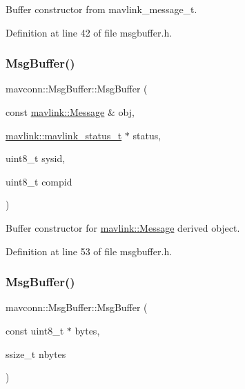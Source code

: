 Buffer constructor from mavlink\+\_\+message\+\_\+t. 



Definition at line 42 of file msgbuffer.\+h.

\mbox{\label{group__mavconn_ga8bcb63913aa131f1c054dc1e18a4d945}} 
\subsubsection{\texorpdfstring{MsgBuffer()}{MsgBuffer()}\hspace{0.1cm}{\footnotesize\ttfamily [3/4]}}
{\footnotesize\ttfamily mavconn\+::\+Msg\+Buffer\+::\+Msg\+Buffer (\begin{DoxyParamCaption}\item[{const \mbox{\hyperlink{structmavlink_1_1Message}{mavlink\+::\+Message}} \&}]{obj,  }\item[{\mbox{\hyperlink{include__v2_80_2mavlink__types_8h_aec6f7af3879252822d8fb108e97aafc2}{mavlink\+::mavlink\+\_\+status\+\_\+t}} $\ast$}]{status,  }\item[{uint8\+\_\+t}]{sysid,  }\item[{uint8\+\_\+t}]{compid }\end{DoxyParamCaption})\hspace{0.3cm}{\ttfamily [inline]}}



Buffer constructor for \mbox{\hyperlink{structmavlink_1_1Message}{mavlink\+::\+Message}} derived object. 



Definition at line 53 of file msgbuffer.\+h.

\mbox{\label{group__mavconn_ga4555922debc003d9ba989aded6714fb5}} 
\subsubsection{\texorpdfstring{MsgBuffer()}{MsgBuffer()}\hspace{0.1cm}{\footnotesize\ttfamily [4/4]}}
{\footnotesize\ttfamily mavconn\+::\+Msg\+Buffer\+::\+Msg\+Buffer (\begin{DoxyParamCaption}\item[{const uint8\+\_\+t $\ast$}]{bytes,  }\item[{ssize\+\_\+t}]{nbytes }\end{DoxyParamCaption})\hspace{0.3cm}{\ttfamily [inline]}}



